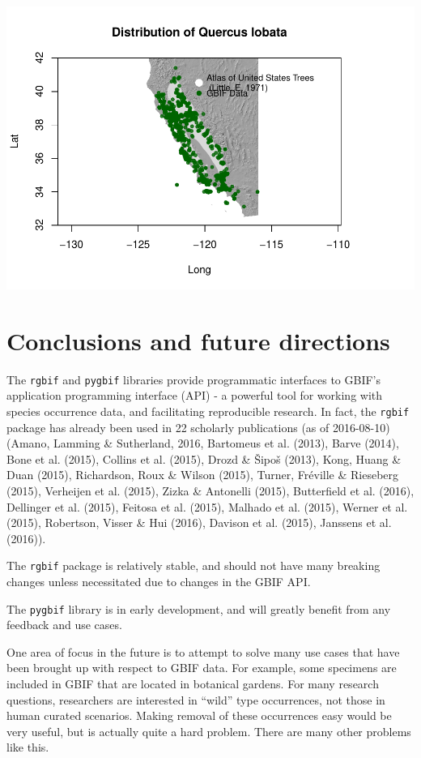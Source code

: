 \documentclass[author-year, review, 11pt]{components/elsarticle} %
\makeatletter
\def\maxwidth{\ifdim\Gin@nat@width>\linewidth\linewidth
\else\Gin@nat@width\fi}
\let\Oldincludegraphics\includegraphics
\renewcommand{\includegraphics}[1]{\Oldincludegraphics[width=\maxwidth]{#1}}
\makeatother
\begin{document}
\includegraphics{components/figure/manuscript-unnamed-chunk-52-1.pdf}

\section{Conclusions and future
directions}\label{conclusions-and-future-directions}

The \texttt{rgbif} and \texttt{pygbif} libraries provide programmatic
interfaces to GBIF's application programming interface (API) - a
powerful tool for working with species occurrence data, and facilitating
reproducible research. In fact, the \texttt{rgbif} package has already
been used in 22 scholarly publications (as of 2016-08-10) (Amano,
Lamming \& Sutherland, 2016, Bartomeus et al. (2013), Barve (2014), Bone
et al. (2015), Collins et al. (2015), Drozd \& {Š}ipo{š} (2013), Kong,
Huang \& Duan (2015), Richardson, Roux \& Wilson (2015), Turner,
Fr{é}ville \& Rieseberg (2015), Verheijen et al. (2015), Zizka \&
Antonelli (2015), Butterfield et al. (2016), Dellinger et al. (2015),
Feitosa et al. (2015), Malhado et al. (2015), Werner et al. (2015),
Robertson, Visser \& Hui (2016), Davison et al. (2015), Janssens et al.
(2016)).

The \texttt{rgbif} package is relatively stable, and should not have
many breaking changes unless necessitated due to changes in the GBIF
API.

The \texttt{pygbif} library is in early development, and will greatly
benefit from any feedback and use cases.

One area of focus in the future is to attempt to solve many use cases
that have been brought up with respect to GBIF data. For example, some
specimens are included in GBIF that are located in botanical gardens.
For many research questions, researchers are interested in ``wild'' type
occurrences, not those in human curated scenarios. Making removal of
these occurrences easy would be very useful, but is actually quite a
hard problem. There are many other problems like this.
\end{document}
